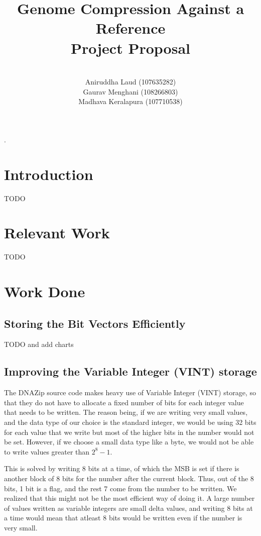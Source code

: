 \documentclass{article}
\title{Genome Compression Against a Reference \\
        Project Proposal \\}
\author{\\
        Aniruddha Laud (107635282)\\
        Gaurav Menghani (108266803)\\
        Madhava Keralapura (107710538)\\}
\begin{document}
\maketitle

\clearpage
.
\clearpage

\tableofcontents

\clearpage

\section {Introduction}
TODO
\clearpage

\section {Relevant Work}
TODO
\clearpage

\section {Work Done}

\subsection {Storing the Bit Vectors Efficiently}
TODO and add charts

\clearpage

\subsection {Improving the Variable Integer (VINT) storage}
The DNAZip source code makes heavy use of Variable Integer (VINT) storage, so that they do not have to allocate a fixed
number of bits for each integer value that needs to be written. The reason being, if we are writing very small values, and the data type of our choice is the standard integer, we would be using 32 bits for each value that we write but most of the higher bits in the number would not be set. However, if we choose a small data type like a byte, we would not be able to write values greater than $2^8 - 1$. 

This is solved by writing 8 bits at a time, of which the MSB is set if there is another block of 8 bits for the number after the current block. Thus, out of the 8 bits, 1 bit is a flag, and the rest 7 come from the number to be written. We realized that this might not be the most efficient way of doing it. A large number of values written as variable integers are small delta values, and writing 8 bits at a time would mean that atleast 8 bits would be written even if the number is very small. 
\end{document}
